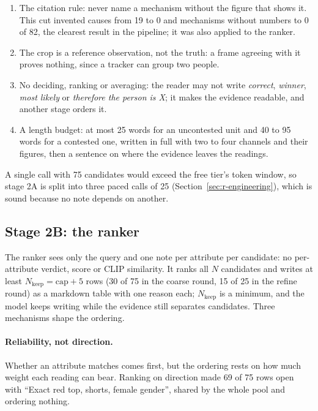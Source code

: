 \begin{enumerate}
\item The citation rule: never name a mechanism without the figure that shows it.
      This cut invented causes from 19 to 0 and mechanisms without numbers to 0 of
      82, the clearest result in the pipeline; it was also applied to the ranker.
\item The crop is a reference observation, not the truth: a frame agreeing with it
      proves nothing, since a tracker can group two people.
\item No deciding, ranking or averaging: the reader may not write \emph{correct},
      \emph{winner}, \emph{most likely} or \emph{therefore the person is X}; it
      makes the evidence readable, and another stage orders it.
\item A length budget: at most 25 words for an uncontested unit and 40 to 95 words
      for a contested one, written in full with two to four channels and their
      figures, then a sentence on where the evidence leaves the readings.
\end{enumerate}

A single call with 75 candidates would exceed the free tier's token window, so
stage 2A is split into three paced calls of 25 (Section~\ref{sec:r-engineering}),
which is sound because no note depends on another.

\subsection{Stage 2B: the ranker}
The ranker sees only the query and one note per attribute per candidate: no
per-attribute verdict, score or CLIP similarity. It ranks all $N$ candidates and
writes at least $N_{\text{keep}} = \text{cap} + 5$ rows (30 of 75 in the coarse
round, 15 of 25 in the refine round) as a markdown table with one reason each;
$N_{\text{keep}}$ is a minimum, and the model keeps writing while the evidence
still separates candidates. Three mechanisms shape the ordering.

\paragraph{Reliability, not direction.} Whether an attribute matches comes first,
but the ordering rests on how much weight each reading can bear. Ranking on
direction made 69 of 75 rows open with ``Exact red top, shorts, female gender'',
shared by the whole pool and ordering nothing.

